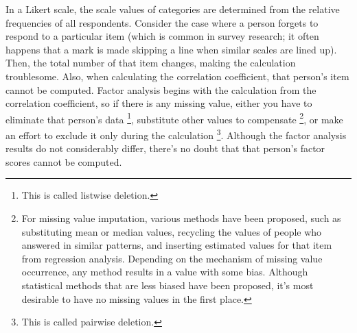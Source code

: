 \documentclass{ltjsbook}
\begin{document}
In a Likert scale, the scale values of categories are determined from the relative frequencies of all respondents. Consider the case where a person forgets to respond to a particular item (which is common in survey research; it often happens that a mark is made skipping a line when similar scales are lined up). Then, the total number of that item changes, making the calculation troublesome. Also, when calculating the correlation coefficient, that person's item cannot be computed. Factor analysis begins with the calculation from the correlation coefficient, so if there is any missing value, either you have to eliminate that person's data \footnote{This is called listwise deletion.}, substitute other values to compensate \footnote{For missing value imputation, various methods have been proposed, such as substituting mean or median values, recycling the values of people who answered in similar patterns, and inserting estimated values for that item from regression analysis. Depending on the mechanism of missing value occurrence, any method results in a value with some bias. Although statistical methods that are less biased have been proposed, it's most desirable to have no missing values in the first place.}, or make an effort to exclude it only during the calculation \footnote{This is called pairwise deletion.}. Although the factor analysis results do not considerably differ, there's no doubt that that person's factor scores cannot be computed.
\end{document}
